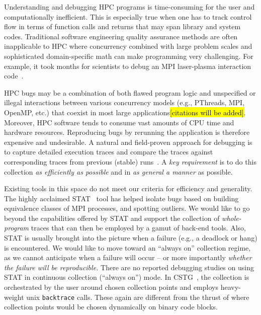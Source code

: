 Understanding and debugging HPC programs 
is time-consuming for the user and computationally inefficient.
%
This is especially true when one has to 
track control flow in terms of function calls and returns that may
span library and system codes. 
%
Traditional software engineering quality assurance methods are 
often inapplicable to HPC where concurrency combined with 
large problem scales and sophisticated domain-specific math can make programming 
very challenging. 
%
For example, it took months for scientists to debug an MPI laser-plasma interaction 
code~\cite{hpcdoe}.


HPC bugs may be a combination of both flawed program logic and unspecified or illegal interactions between various concurrency models (e.g., PThreads, MPI, OpenMP, etc.) that coexist in most large applications\hl{[citations will be added]}. Moreover, HPC software tends to consume vast amounts of CPU time and hardware resources. Reproducing bugs by rerunning the application is therefore expensive and undesirable. 
A natural and field-proven approach for debugging is to capture detailed execution traces and compare the traces against corresponding traces from previous (stable) runs~\cite{stat,cstg}.
%
A {\em key requirement} is to do this collection {\em as efficiently as possible}
and in {\em as general a manner} as possible.


Existing tools in this space
do not meet our criteria for efficiency and generality.
%
The highly acclaimed STAT~\cite{stat} tool has helped isolate
bugs based on building equivalence classes of MPI processes, and spotting
outliers.
%
We would like to go beyond the capabilities offered by STAT and support
the collection of {\em whole-program} traces that can then be employed
by a  gamut of back-end tools.
%
Also, STAT is usually brought into the picture
when a failure (e.g., a deadlock or hang) is encountered. We would like
to move toward an ``always on'' collection regime, as we cannot anticipate
when a failure will occur -- or more importantly {\em whether the failure
will be reproducible.}
%
There are no reported debugging studies on using STAT in
continuous collection (``always on'') mode.
%
In CSTG~\cite{cstg}, the collection is orchestrated by the
user around chosen collection points and employs heavy-weight
unix {\tt backtrace} calls.
%
These again are different from the thrust of \parlot where collection points would be chosen dynamically on binary code blocks.


